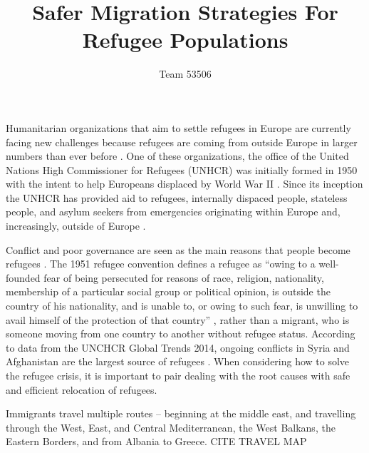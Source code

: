 \documentclass{article}
\title{Safer Migration Strategies For Refugee Populations}
\author{Team 53506}
\begin{document}
\maketitle
\tableofcontents

\maketitle

\newpage


Humanitarian organizations that aim to settle refugees in Europe are currently facing new challenges because refugees are coming from outside Europe in larger numbers than ever before \cite{simpson}. One of these organizations, the office of the United Nations High Commissioner for Refugees (UNHCR) was initially formed in 1950 with the intent to help Europeans displaced by World War II \cite{historyUNHCR}. Since its inception the UNHCR has provided aid to refugees, internally dispaced people, stateless people, and asylum seekers from emergencies originating within Europe and, increasingly, outside of Europe \cite{historyUNHCR}.

Conflict and poor governance are seen as the main reasons that people become refugees \cite{simpson}. The 1951 refugee convention defines a refugee as ``owing to a well-founded fear of being persecuted for reasons of race, religion, nationality, membership of a particular social group or political opinion, is outside the country of his nationality, and is unable to, or owing to such fear, is unwilling to avail himself of the protection of that country'' \cite{1951convention}, rather than a migrant, who is someone moving from one country to another without refugee status. According to data from the UNCHCR Global Trends 2014, ongoing conflicts in Syria and Afghanistan are the largest source of refugees \cite{refugeefactsheet}. When considering how to solve the refugee crisis, it is important to pair dealing with the root causes with safe and efficient relocation of refugees.

Immigrants travel multiple routes -- beginning at the middle east, and travelling through the West, East, and Central Mediterranean, the West Balkans, the Eastern Borders, and from Albania to Greece.
CITE TRAVEL MAP
\end{document}

